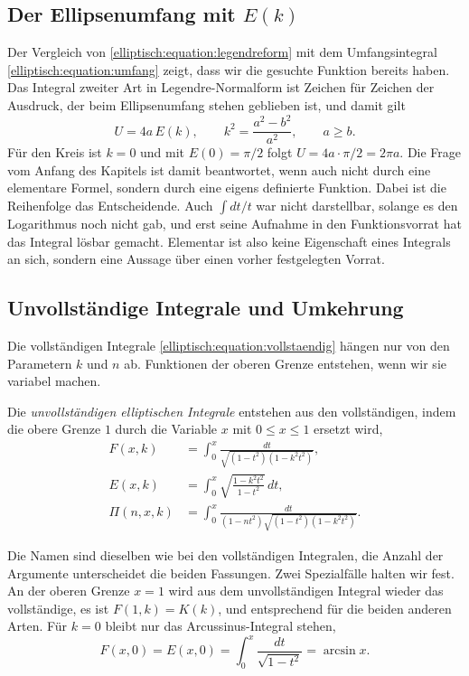 \subsection{Der Ellipsenumfang mit $E(k)$
\label{elliptisch:subsection:ellipsenumfangE}}
Der Vergleich von \eqref{elliptisch:equation:legendreform} mit dem
Umfangsintegral \eqref{elliptisch:equation:umfang} zeigt, dass wir
die gesuchte Funktion bereits haben.
Das Integral zweiter Art in Legendre-Normalform ist Zeichen für
Zeichen der Ausdruck, der beim Ellipsenumfang stehen geblieben ist,
und damit gilt
\begin{equation}
U
=
4a\,E(k),
\qquad
k^2 = \frac{a^2-b^2}{a^2},
\qquad
a \ge b.
\label{elliptisch:equation:umfangE}
\end{equation}
Für den Kreis ist $k = 0$ und mit $E(0) = \pi/2$ folgt
$U = 4a\cdot\pi/2 = 2\pi a$.
Die Frage vom Anfang des Kapitels ist damit beantwortet, wenn auch
nicht durch eine elementare Formel, sondern durch eine eigens
definierte Funktion.
Dabei ist die Reihenfolge das Entscheidende.
Auch $\int dt/t$ war nicht darstellbar, solange es den Logarithmus
noch nicht gab, und erst seine Aufnahme in den Funktionsvorrat hat
das Integral lösbar gemacht.
Elementar ist also keine Eigenschaft eines Integrals an sich,
sondern eine Aussage über einen vorher festgelegten Vorrat.

\subsection{Unvollständige Integrale und Umkehrung
\label{elliptisch:subsection:unvollstaendig}}
Die vollständigen Integrale \eqref{elliptisch:equation:vollstaendig}
hängen nur von den Parametern $k$ und $n$ ab.
Funktionen der oberen Grenze entstehen, wenn wir sie variabel
machen.
\begin{definition}
\label{elliptisch:definition:unvollstaendig}
Die \emph{unvollständigen elliptischen Integrale} entstehen aus
den vollständigen, indem die obere Grenze $1$ durch die Variable
$x$ mit $0 \le x \le 1$ ersetzt wird,
\begin{equation}
\begin{aligned}
F(x,k)
&=
\int_0^x \frac{dt}{\sqrt{(1-t^2)(1-k^2t^2)}},
\\
E(x,k)
&=
\int_0^x \sqrt{\frac{1-k^2t^2}{1-t^2}}\,dt,
\\
\Pi(n,x,k)
&=
\int_0^x \frac{dt}{(1-nt^2)\sqrt{(1-t^2)(1-k^2t^2)}}.
\end{aligned}
\label{elliptisch:equation:unvollstaendig}
\end{equation}
\end{definition}
%
Die Namen sind dieselben wie bei den vollständigen Integralen,
die Anzahl der Argumente unterscheidet die beiden Fassungen.
Zwei Spezialfälle halten wir fest.
An der oberen Grenze $x = 1$ wird aus dem unvollständigen
Integral wieder das vollständige, es ist $F(1,k) = K(k)$, und
entsprechend für die beiden anderen Arten.
Für $k = 0$ bleibt nur das Arcussinus-Integral stehen,
\begin{equation}
F(x,0)
=
E(x,0)
=
\int_0^x \frac{dt}{\sqrt{1-t^2}}
=
\arcsin x.
\label{elliptisch:equation:knullarcsin}
\end{equation}

